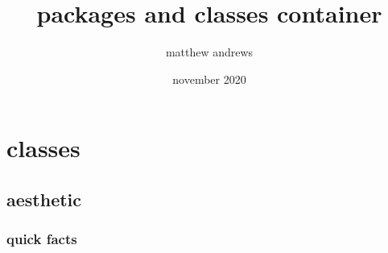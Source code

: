 \documentclass[lowerhead,12pt]{aesthetic}
\title{packages and classes container}
\author{matthew andrews}
\date{november 2020}
\begin{document}
\frontmatter
\maketitle
\thispagestyle{empty}
\clearpage

\contents
\listoflistings

\mainmatter
\part{classes}
\chapter{aesthetic}
\section{quick facts}
\end{document}
